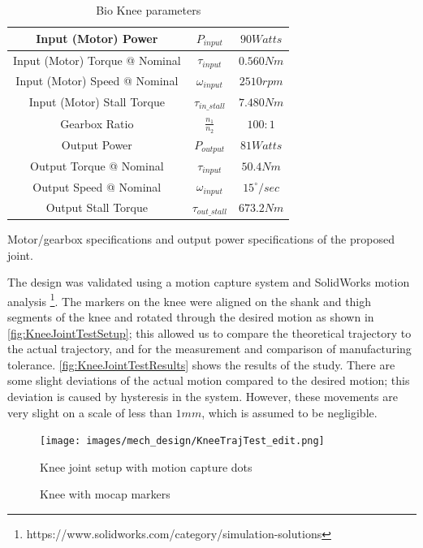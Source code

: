 \begin{table}
    \centering
    \begin{tabular}{||c|c|c||}
        \hline
        Input (Motor) Power & \(P_{input}\) & \(90 Watts\) \\
        \hline
        Input (Motor) Torque @ Nominal & \(\tau_{input}\) & \(0.560 Nm\) \\
        \hline
        Input (Motor) Speed @ Nominal & \(\omega_{input}\) & \(2510 rpm\) \\
        \hline
        Input (Motor) Stall Torque & \(\tau_{in\_stall}\) & \(7.480 Nm\) \\
        \hline \hline
        Gearbox Ratio & \(\frac{n_1}{n_2}\) & \(100:1\) \\
        \hline \hline
        Output Power & \(P_{output}\) & \(81 Watts\) \\
        \hline
        Output Torque @ Nominal & \(\tau_{input}\) & \(50.4 Nm\) \\
        \hline
        Output Speed @ Nominal & \(\omega_{input}\) & \(15^\circ/sec\) \\
        \hline
        Output Stall Torque & \(\tau_{out\_stall}\) & \(673.2 Nm\) \\
        \hline
    \end{tabular}
    \caption{Bio Knee parameters}{Motor/gearbox specifications and output power specifications of the proposed joint.}
    \label{table:MotorGearboxSpecs}
\end{table}

The design was validated using a motion capture system and SolidWorks motion analysis \footnote{https://www.solidworks.com/category/simulation-solutions}. The markers on the knee were aligned on the shank and thigh segments of the knee and rotated through the desired motion as shown in \autoref{fig:KneeJointTestSetup}; this allowed us to compare the theoretical trajectory to the actual trajectory, and for the measurement and comparison of manufacturing tolerance. \autoref{fig:KneeJointTestResults} shows the results of the study. There are some slight deviations of the actual motion compared to the desired motion; this deviation is caused by hysteresis in the system. However, these movements are very slight on a scale of less than $1mm$, which is assumed to be negligible.   



\begin{figure}[ht!]
    \centering
    \texttt{[image: images/mech\_design/KneeTrajTest\_edit.png]}
    \caption{Knee with mocap markers}{Knee joint setup with motion capture dots}
    \label{fig:KneeJointTestSetup}
\end{figure}

